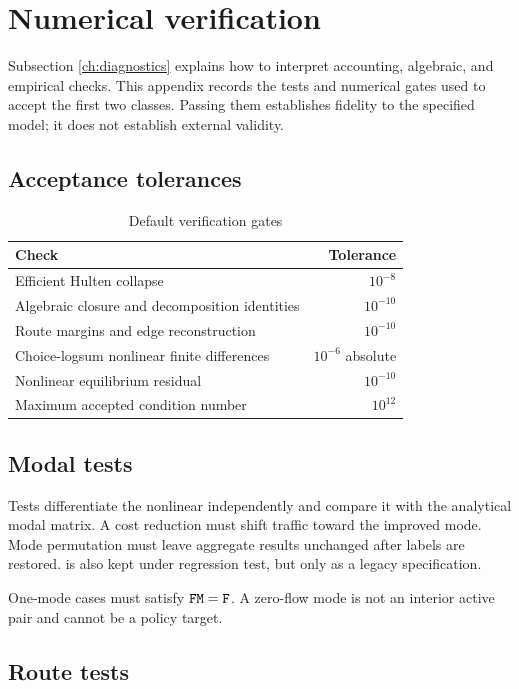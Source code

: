 \section{Numerical verification}
\label{app:verification}

Subsection \ref{ch:diagnostics} explains how to interpret accounting, algebraic,
and empirical checks. This appendix records the tests and numerical gates used
to accept the first two classes. Passing them establishes fidelity to the
specified model; it does not establish external validity.

\subsection{Acceptance tolerances}

\begin{table}[H]
\centering
\caption{Default verification gates}
\begin{tabular}{lr}
\toprule
Check & Tolerance \\
\midrule
Efficient Hulten collapse & \(10^{-8}\) \\
Algebraic closure and decomposition identities & \(10^{-10}\) \\
Route margins and edge reconstruction & \(10^{-10}\) \\
Choice-logsum nonlinear finite differences & \(10^{-6}\) absolute \\
Nonlinear equilibrium residual & \(10^{-10}\) \\
Maximum accepted condition number & \(10^{12}\) \\
\bottomrule
\end{tabular}
\end{table}

\subsection{Modal tests}

Tests differentiate the nonlinear  independently and
compare it with the analytical modal matrix. A cost reduction must shift
traffic toward the improved mode. Mode permutation must leave aggregate
results unchanged after labels are restored.  is also kept
under regression test, but only as a legacy specification.

One-mode cases must satisfy \(\texttt{FM}=\texttt{F}\). A zero-flow mode is not an
interior active pair and cannot be a policy target.

\subsection{Route tests}

